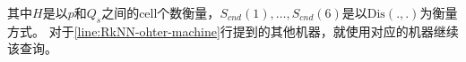 \documentclass{ML}
\def\biglen{20cm} %
\def\n{2} %
\def\maxxy{6} %
\def\maxy{3}
\begin{document}
其中$H$是以$p$和$Q_s$之间的cell个数衡量，$S_{cnd}(1),\dots,S_{cnd}(6)$是以$\mathrm{Dis}(.,.)$为衡量方式。
对于\ref{line:RkNN-ohter-machine}行提到的其他机器，就使用对应的机器继续该查询。

\end{document}
